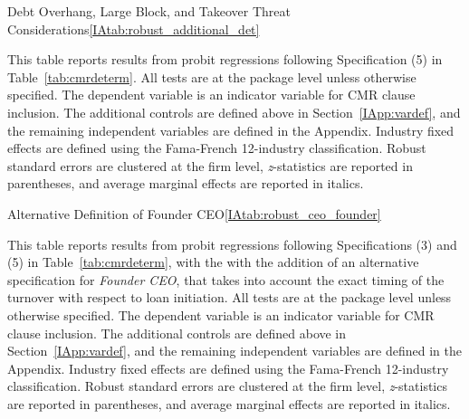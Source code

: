 \documentclass[12pt]{article}
\begin{document}
\begin{appendices}
\begin{singlespace}
\begin{papertable}{Debt Overhang, Large Block, and Takeover Threat Considerations}{\ref{IAtab:robust_additional_det}}{}
  \label{IAtab:robust_additional_det}

  This table reports results from probit regressions following Specification (5) in Table~\ref{tab:cmrdeterm}.
  All tests are at the package level unless otherwise specified.
  The dependent variable is an indicator variable for CMR clause inclusion.
  The additional controls are defined above in Section~\ref{IApp:vardef}, and the remaining independent variables are defined in the Appendix.
  Industry fixed effects are defined using the Fama-French 12-industry classification.
  Robust standard errors are clustered at the firm level, \textit{z}-statistics are reported in parentheses, and average marginal effects are reported in italics.
  \postamblesig

  \startdata
  

\end{papertable}





\begin{papertable}{Alternative Definition of Founder CEO}{\ref{IAtab:robust_ceo_founder}}{}
  \label{IAtab:robust_ceo_founder}

  This table reports results from probit regressions following Specifications (3) and (5) in Table~\ref{tab:cmrdeterm}, with the with the addition of an alternative specification for \textit{Founder CEO}, that takes into account the exact timing of the turnover with respect to loan initiation.
  All tests are at the package level unless otherwise specified.
  The dependent variable is an indicator variable for CMR clause inclusion.
  The additional controls are defined above in Section~\ref{IApp:vardef}, and the remaining independent variables are defined in the Appendix.
  Industry fixed effects are defined using the Fama-French 12-industry classification.
  Robust standard errors are clustered at the firm level, \textit{z}-statistics are reported in parentheses, and average marginal effects are reported in italics.
  \postamblesig

  \startdata
  
\end{papertable}





\end{singlespace}
\end{appendices}
\end{document}
